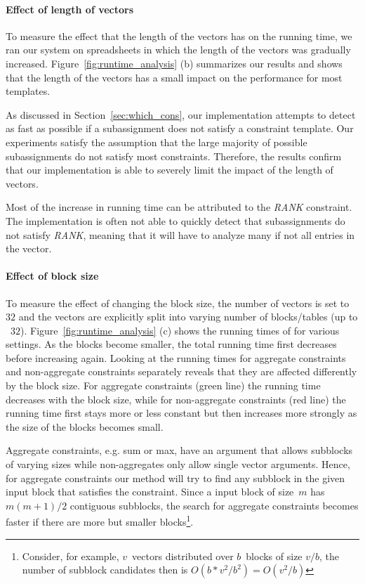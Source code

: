 \paragraph{Effect of length of vectors}
To measure the effect that the length of the vectors has on the running time, we ran our system on spreadsheets in which the length of the vectors was gradually increased.
Figure~\ref{fig:runtime_analysis} (b) summarizes our results and shows that the length of the vectors has a small impact on the performance for most templates.

As discussed in Section~\ref{sec:which_cons}, our implementation attempts to detect as fast as possible if a subassignment does not satisfy a constraint template.
Our experiments satisfy the assumption that the large majority of possible subassignments do not satisfy most constraints.
Therefore, the results confirm that our implementation is able to severely limit the impact of the length of vectors.

Most of the increase in running time can be attributed to the \textit{RANK} constraint.
The implementation is often not able to quickly detect that subassignments do not satisfy \textit{RANK}, meaning that it will have to analyze many if not all entries in the vector.

\paragraph{Effect of block size}
To measure the effect of changing the block size, the number of vectors is set to~$32$ and the vectors are explicitly split into varying number of blocks/tables (up to ~$32$).
Figure~\ref{fig:runtime_analysis} (c) shows the running times of \sname for various settings.
As the blocks become smaller, the total running time first decreases before increasing again.
Looking at the running times for aggregate constraints and non-aggregate constraints  separately reveals that they are affected differently by the block size.
For aggregate constraints (green line) the running time decreases with the block size, while for non-aggregate constraints (red line) the running time first stays more or less constant but then increases more strongly as the size of the blocks becomes small.

Aggregate constraints, e.g. sum or max, have an argument that allows subblocks of varying sizes while non-aggregates only allow single vector arguments. Hence, for aggregate constraints our method will try to find any subblock in the given input block that satisfies the constraint.
Since a input block of size~$m$ has $m(m+1)/2$ contiguous subblocks, the search for aggregate constraints becomes faster if there are more but smaller blocks\footnote{Consider, for example, $v$~vectors distributed over $b$~blocks of size $v/b$, the number of subblock candidates then is $O(b * v^2 / b^2) = O(v^2 / b)$}.

